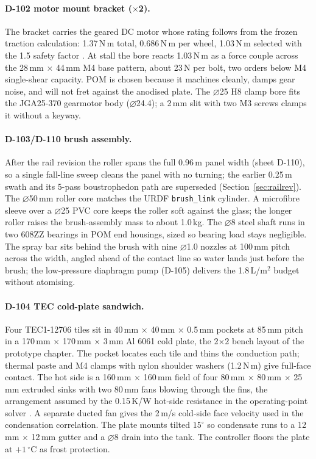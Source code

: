 \documentclass[11pt,a4paper]{article}
\begin{document}
\paragraph{D-102 motor mount bracket ($\times$2).}
The bracket carries the geared DC motor whose rating follows from the frozen
traction calculation: 1.37\,N\,m total, 0.686\,N\,m per wheel, 1.03\,N\,m
selected with the 1.5 safety factor \cite{siegwart2011mobilerobots}. At
stall the bore reacts 1.03\,N\,m as a force couple across the 28\,mm
$\times$ 44\,mm M4 base pattern, about 23\,N per bolt, two orders below M4
single-shear capacity. POM is chosen because it machines cleanly, damps gear
noise, and will not fret against the anodised plate. The $\varnothing$25 H8
clamp bore fits the JGA25-370 gearmotor body ($\varnothing$24.4); a 2\,mm
slit with two M3 screws clamps it without a keyway.

\paragraph{D-103/D-110 brush assembly.}
After the rail revision the roller spans the full 0.96\,m panel width (sheet
D-110), so a single fall-line sweep cleans the panel with no turning; the
earlier 0.25\,m swath and its 5-pass boustrophedon path are superseded
(Section~\ref{sec:railrev}). The $\varnothing$50\,mm roller core matches the
URDF \texttt{brush\_link} cylinder. A microfibre sleeve over a $\varnothing$25
PVC core keeps the roller soft against the glass; the longer roller raises the
brush-assembly mass to about 1.0\,kg. The $\varnothing$8 steel shaft runs in
two 608ZZ bearings in POM end housings, sized so bearing load stays
negligible. The spray bar sits behind the brush with nine $\varnothing$1.0
nozzles at 100\,mm pitch across the width, angled ahead of the contact line so
water lands just before the brush; the low-pressure diaphragm pump (D-105)
delivers the 1.8\,L/m$^2$ budget without atomising.

\paragraph{D-104 TEC cold-plate sandwich.}
Four TEC1-12706 tiles \cite{tec12706ds} sit in 40\,mm $\times$ 40\,mm
$\times$ 0.5\,mm pockets at 85\,mm pitch in a 170\,mm $\times$ 170\,mm
$\times$ 3\,mm Al 6061 cold plate, the 2$\times$2 bench layout of the
prototype chapter. The pocket locates each tile and thins the conduction
path; thermal paste and M4 clamps with nylon shoulder washers (1.2\,N\,m)
give full-face contact. The hot side is a 160\,mm $\times$ 160\,mm field of
four 80\,mm $\times$ 80\,mm $\times$ 25\,mm extruded sinks with two 80\,mm
fans blowing through the fins, the arrangement assumed by the 0.15\,K/W
hot-side resistance in the operating-point solver
\cite{zhao2022teccondenser,lin2022heatsink}. A separate ducted fan gives the
2\,m/s cold-side face velocity used in the condensation correlation. The
plate mounts tilted $15^\circ$ so condensate runs to a 12\,mm $\times$
12\,mm gutter and a $\varnothing$8 drain into the tank. The controller
floors the plate at $+1\,^\circ$C as frost protection.
\end{document}

